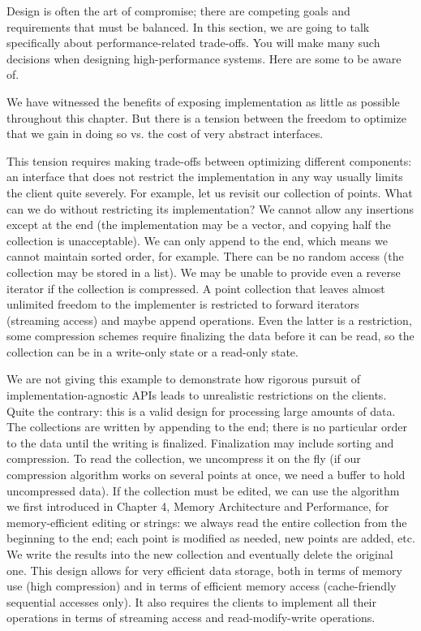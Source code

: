 
Design is often the art of compromise; there are competing goals and requirements that must be balanced. In this section, we are going to talk specifically about performance-related trade-offs. You will make many such decisions when designing high-performance systems. Here are some to be aware of.


We have witnessed the benefits of exposing implementation as little as possible throughout this chapter. But there is a tension between the freedom to optimize that we gain in doing so vs. the cost of very abstract interfaces. 

This tension requires making trade-offs between optimizing different components: an interface that does not restrict the implementation in any way usually limits the client quite severely. For example, let us revisit our collection of points. What can we do without restricting its implementation? We cannot allow any insertions except at the end (the implementation may be a vector, and copying half the collection is unacceptable). We can only append to the end, which means we cannot maintain sorted order, for example. There can be no random access (the collection may be stored in a list). We may be unable to provide even a reverse iterator if the collection is compressed. A point collection that leaves almost unlimited freedom to the implementer is restricted to forward iterators (streaming access) and maybe append operations. Even the latter is a restriction, some compression schemes require finalizing the data before it can be read, so the collection can be in a write-only state or a read-only state.

We are not giving this example to demonstrate how rigorous pursuit of implementation-agnostic APIs leads to unrealistic restrictions on the clients. Quite the contrary: this is a valid design for processing large amounts of data. The collections are written by appending to the end; there is no particular order to the data until the writing is finalized. Finalization may include sorting and compression. To read the collection, we uncompress it on the fly (if our compression algorithm works on several points at once, we need a buffer to hold uncompressed data). If the collection must be edited, we can use the algorithm we first introduced in Chapter 4, Memory Architecture and Performance, for memory-efficient editing or strings: we always read the entire collection from the beginning to the end; each point is modified as needed, new points are added, etc. We write the results into the new collection and eventually delete the original one. This design allows for very efficient data storage, both in terms of memory use (high compression) and in terms of efficient memory access (cache-friendly sequential accesses only). It also requires the clients to implement all their operations in terms of streaming access and read-modify-write operations. 

